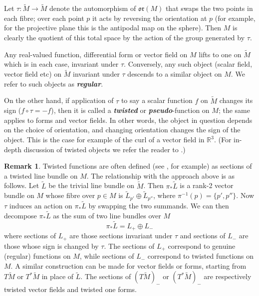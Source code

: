 \documentclass[11pt,twoside]{article}
\theoremstyle{definition}
\newtheorem{rem}[theorem]{Remark}
\numberwithin{equation}{section}
\def\Mt{\widetilde{M}}
\def\defn#1{{\itshape\bfseries#1}}
\begin{document}
Let $\tau:\Mt\to \Mt$ denote the  automorphism of $\mathfrak{or}(M)$ that swaps the two points in each fibre; over each point $p$ it acts by reversing the orientation at $p$ (for example, for the projective plane this is the antipodal map on the sphere).  Then $M$ is clearly the quotient of this total space by the action of the group generated by $\tau$.    

Any real-valued function, differential form or vector field on $M$ lifts to one on $\Mt$ which is in each case, invariant under $\tau$.  Conversely, any such object (scalar field, vector field etc) on $\Mt$ invariant under $\tau$ descends to a similar object on $M$. We refer to such objects as \defn{regular}.

On the other hand, if application of $\tau$ to say a scalar function $f$ on $\Mt$ changes its sign ($f\circ\tau=-f$), then it is called a \defn{twisted} or \defn{pseudo}-function on $M$; the same applies to forms and vector fields.  In other words, the object in question depends on the choice of orientation, and changing orientation changes the sign of the object.  This is the case for example of the curl of a vector field in $\mathbb{R}^3$. (For in-depth discussion of twisted objects we refer the reader to \cite{abraham2012manifolds,bott2013differential, bossavitdifferential}.)


   
\begin{rem}\label{rmk:line bundle}
Twisted functions are often defined (see \cite{ncatlab,penrose2006road}, for example) as sections of a twisted line bundle on $M$. The relationship with the approach above is as follows.  Let $\widetilde{L}$ be the trivial line bundle on $\Mt$.  Then $\pi_*\widetilde{L}$ is a rank-2 vector bundle on $M$ whose fibre over $p\in M$ is $\widetilde{L}_{p'}\oplus \widetilde{L}_{p''}$, where $\pi^{-1}(p)=\{p',p''\}$. Now $\tau$ induces an action on $\pi_*\widetilde{L}$ by swapping the two summands.  We can then decompose $\pi_*\widetilde{L}$ as the sum of two line bundles over $M$
$$\pi_*\widetilde{L} = L_+\oplus L_-$$
where sections of $L_+$ are those sections invariant under $\tau$ and sections of $L_-$ are those whose sign is changed by $\tau$.  The sections of $L_+$ correspond to genuine (regular) functions on $M$, while sections of $L_-$ correspond to twisted functions on $M$. 
A similar construction can be made for vector fields or forms, starting from $T\Mt$ or $T^*\Mt$ in place of $\widetilde{L}$. The sections of $(T\Mt)_-$ or $(T^{\ast}\Mt)_-$ are respectively twisted vector fields and twisted one forms.
\end{rem}
\end{document}
